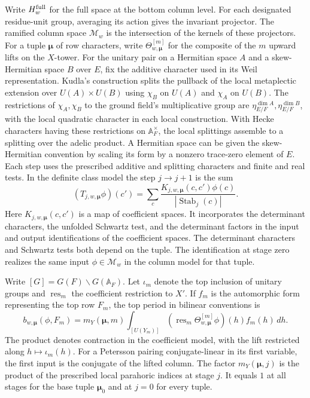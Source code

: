 Write \(H_w^{\rm full}\) for the full space at the bottom column level.
For each designated residue-unit group, averaging its action gives
the invariant projector. The ramified column space \(\mathcal M_w\)
is the intersection of the kernels of these projectors. For a tuple
\(\boldsymbol\mu\) of row characters, write
\(\Theta^{[m]}_{w,\boldsymbol\mu}\) for the composite of the \(m\)
upward lifts on the \(X\)-tower. For the unitary pair on a Hermitian
space \(A\) and a skew-Hermitian space \(B\) over \(E\), fix the additive
character used in its Weil representation. Kudla's construction splits
the pullback of the local metaplectic extension over \(U(A)\times U(B)\)
using \(\chi_B\) on \(U(A)\) and \(\chi_A\) on \(U(B)\). The restrictions
of \(\chi_A,\chi_B\) to the ground field's multiplicative group are
\(\eta_{E/F}^{\dim A},\eta_{E/F}^{\dim B}\), with the local quadratic
character in each local construction. With Hecke characters having
these restrictions on \(\mathbb A_F^\times\), the local splittings
assemble to a splitting over the adelic product. A Hermitian space
can be given the skew-Hermitian convention by scaling its form by a
nonzero trace-zero element of \(E\).
\cite[\S\S3.1.1 and 4.1.1]{p2borade-et-al}
Each step uses the prescribed additive and splitting characters and
finite and real tests. In the definite class model the step \(j\to j+1\)
is the sum
\[
 (T_{j,w,\boldsymbol\mu}\phi)(c')
 =\sum_c \frac{K_{j,w,\boldsymbol\mu}(c,c')\phi(c)}
                 {|\operatorname{Stab}_j(c)|}.
\]
Here \(K_{j,w,\boldsymbol\mu}(c,c')\) is a map of coefficient spaces. It
incorporates the determinant characters, the unfolded Schwartz test,
and the determinant factors in the input and output identifications of
the coefficient spaces. The determinant characters and Schwartz tests
both depend on the tuple. The identification at stage zero realizes the
same input \(\phi\in\mathcal M_w\) in the column model for that tuple.

Write \([G]=G(F)\backslash G(\mathbb A_F)\). Let \(\iota_m\) denote the
top inclusion of unitary groups and \(\operatorname{res}_m\) the
coefficient restriction to \(X'\). If \(f_m\) is the automorphic form
representing the top row \(F_m\), the top period in bilinear conventions is
\begin{equation}
\label{eq:period-top}
 b_{w,\boldsymbol\mu}(\phi,F_m)
 =m_Y(\boldsymbol\mu,m)\int_{[U(Y_m)]}
     (\operatorname{res}_m\Theta^{[m]}_{w,\boldsymbol\mu}\phi)(h)
     f_m(h)\,dh .
\end{equation}
The product denotes contraction in the coefficient model, with the
lift restricted along \(h\mapsto\iota_m(h)\). For a Petersson pairing
conjugate-linear in its first variable, the first input is the
conjugate of the lifted column. The factor \(m_Y(\boldsymbol\mu,j)\)
is the product of the prescribed local parahoric indices at stage
\(j\). It equals \(1\) at all stages for the base tuple
\(\boldsymbol\mu_0\) and at \(j=0\) for every tuple.


